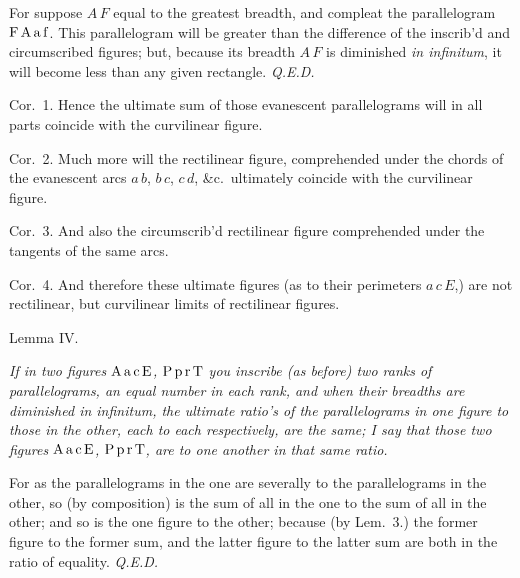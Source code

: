 \bigbreak

For suppose $A \, F$ equal to the greatest breadth, and compleat
the parallelogram ${\rm F} \, {\rm A} \, {\rm a} \, {\rm f}$.
This parallelogram will be greater than the difference of the
inscrib'd and circumscribed figures; but, because its breadth
$A \, F$ is diminished {\it in infinitum}, it will become less
than any given rectangle.
{\it Q.E.D.}

{\sc Cor.}~1.
Hence the ultimate sum of those evanescent parallelograms will in
all parts coincide with the curvilinear figure.

{\sc Cor.}~2.
Much more will the rectilinear figure, comprehended under the
chords of the evanescent arcs $a \, b$, $b \, c$, $c \, d$,
\&c.\ ultimately coincide with the curvilinear figure.

{\sc Cor.}~3.
And also the circumscrib'd rectilinear figure comprehended under
the tangents of the same arcs.

{\sc Cor.}~4.
And therefore these ultimate figures (as to their perimeters $a
\, c \, E$,) are not rectilinear, but curvilinear limits of
rectilinear figures.

\bigbreak

\centerline{\largesc Lemma IV.}

\nobreak\bigskip

{\it
If in two figures
${\rm A} \, {\rm a} \, {\rm c} \, {\rm E}$,
${\rm P} \, {\rm p} \, {\rm r} \, {\rm T}$
you inscribe (as before) two ranks of parallelograms, an equal
number in each rank, and when their breadths are diminished\/
{\rm in infinitum,} the ultimate ratio's of the parallelograms in
one figure to those in the other, each to each respectively, are
the same; I say that those two figures
${\rm A} \, {\rm a} \, {\rm c} \, {\rm E}$,
${\rm P} \, {\rm p} \, {\rm r} \, {\rm T}$,
are to one another in that same ratio.}

\midinsert
\centerline{}
\endinsert

\bigbreak

For as the parallelograms in the one are severally to the
parallelograms in the other, so (by composition) is the sum of
all in the one to the sum of all in the other; and so is the one
figure to the other; because (by Lem.~3.) the former figure to
the former sum, and the latter figure to the latter sum are both
in the ratio of equality.
{\it Q.E.D.}

